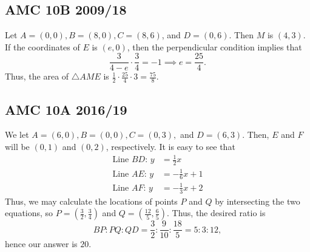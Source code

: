 \documentclass[11pt]{scrartcl}
\begin{document}
\subsection{AMC 10B 2009/18}
Let $A=(0,0),B=(8,0),C=(8,6)$, and $D=(0,6)$. Then $M$ is $(4, 3)$. If the coordinates of $E$ is $(e, 0)$, then the perpendicular condition implies that 
\[\frac{3}{4-e} \cdot \frac{3}{4} = -1 \implies e = \frac{25}{4}.\]
Thus, the area of $\triangle AME$ is $\frac12 \cdot \frac{25}{4} \cdot 3 = \boxed{\frac{75}{8}}$.

\subsection{AMC 10A 2016/19}
We let $A = (6, 0), B = (0, 0), C = (0, 3),$ and $D = (6, 3)$. Then, $E$ and $F$ will be $(0, 1)$ and $(0, 2)$, respectively.  It is easy to see that
\begin{align*}
\text{Line } BD \text{: } y &= \frac 12 x\\
\text{Line } AE \text{: } y &= -\frac 16 x + 1 \\
\text{Line } AF \text{: } y &= -\frac 13 x + 2 
\end{align*}
Thus, we may calculate the locations of points $P$ and $Q$ by intersecting the two equations, so $P= (\frac 32, \frac 34)$ and $Q = (\frac{12}{5}, \frac{6}{5})$. Thus, the desired ratio is 
\[BP : PQ : QD = \frac 32 : \frac{9}{10} : \frac{18}{5} = 5 : 3 : 12,\]
hence our answer is $\boxed{20}$. 
\end{document}
